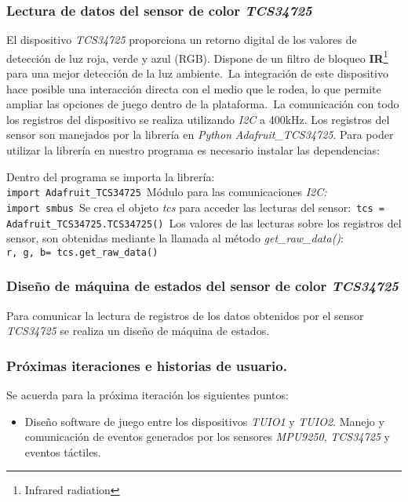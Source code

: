 \subsubsection{Lectura de datos del sensor de color \emph{TCS34725}}
El dispositivo \emph{TCS34725} proporciona un retorno digital de los valores de detección de luz roja, verde y azul (RGB). Dispone de un filtro de bloqueo \textbf{IR}\footnote{Infrared radiation} para una mejor detección de la luz ambiente.\
La integración de este dispositivo hace posible una interacción directa con el medio que le rodea, lo que permite ampliar las opciones de juego dentro de la plataforma.\
La comunicación con todo los registros del dispositivo se realiza utilizando \emph{I2C} a 400kHz.
Los registros del sensor son manejados por la librería en \emph{Python} \emph{Adafruit\_TCS34725}.
Para poder utilizar la librería en nuestro programa es necesario instalar las dependencias:\
Dentro del programa se importa la librería:\\
\texttt{import Adafruit\_TCS34725}\
Módulo para las comunicaciones \emph{I2C:}\\
\texttt{import smbus}\
Se crea el objeto \emph{tcs} para acceder las lecturas del sensor:\
\texttt{tcs = Adafruit\_TCS34725.TCS34725()}\
Los valores de las lecturas sobre los registros del sensor, son obtenidas mediante la llamada al método \emph{get\_raw\_data()}:\\
\texttt{r, g, b= tcs.get\_raw\_data()}
\subsubsection{Diseño de máquina de estados del sensor de color \emph{TCS34725}}
Para comunicar la lectura de registros de los datos obtenidos por el sensor \emph{TCS34725} se realiza un diseño de máquina de estados.
\subsubsection{Próximas iteraciones e historias de usuario.}
Se acuerda para la próxima iteración los siguientes puntos:
\begin{itemize}
\item Diseño software de juego entre los dispositivos \emph{TUIO1} y \emph{TUIO2}. Manejo y comunicación de eventos generados por los sensores \emph{MPU9250}, \emph{TCS34725} y eventos táctiles.
\end{itemize}
